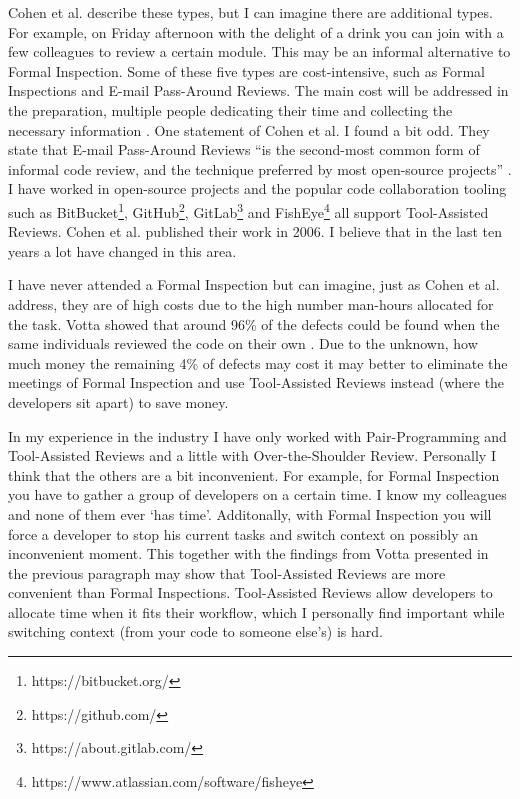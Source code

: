 Cohen et al. describe these types, but I can imagine there are additional types.
For example, on Friday afternoon with the delight of a drink you can join with a few colleagues to review a certain module. This may be an informal alternative to Formal Inspection.
Some of these five types are cost-intensive, such as Formal Inspections and E-mail Pass-Around Reviews.
The main cost will be addressed in the preparation, multiple people dedicating their time and collecting the necessary information \autocite[23--38]{cohen2006best}.
One statement of Cohen et al. I found a bit odd.
They state that E-mail Pass-Around Reviews ``is the second-most common form of informal code review, and the technique preferred by most open-source projects'' \autocite[30]{cohen2006best}.
I have worked in open-source projects and the popular code collaboration tooling such as
BitBucket\footnote{https://bitbucket.org/},
GitHub\footnote{https://github.com/},
GitLab\footnote{https://about.gitlab.com/}
and FishEye\footnote{https://www.atlassian.com/software/fisheye}
all support Tool-Assisted Reviews.
Cohen et al. published their work in 2006. I believe that in the last ten years a lot have changed in this area.

I have never attended a Formal Inspection but can imagine, just as Cohen et al. address, they are of high costs due to the high number man-hours allocated for the task.
Votta showed that around 96\% of the defects could be found when the same individuals reviewed the code on their own \autocite[110]{Votta:1993:INM:256428.167070}.
Due to the unknown, how much money the remaining 4\% of defects may cost it may better to eliminate the meetings of Formal Inspection and use Tool-Assisted Reviews instead (where the developers sit apart) to save money.

In my experience in the industry I have only worked with Pair-Programming and Tool-Assisted Reviews and a little with Over-the-Shoulder Review. Personally I think that the others are a bit inconvenient.
For example, for Formal Inspection you have to gather a group of developers on a certain time.
I know my colleagues and none of them ever `has time'.
Additonally, with Formal Inspection you will force a developer to stop his current tasks and switch context on possibly an inconvenient moment.
This together with the findings from Votta presented in the previous paragraph may show that Tool-Assisted Reviews are more convenient than Formal Inspections.
Tool-Assisted Reviews allow developers to allocate time when it fits their workflow, which I personally find important while switching context (from your code to someone else's) is hard.

